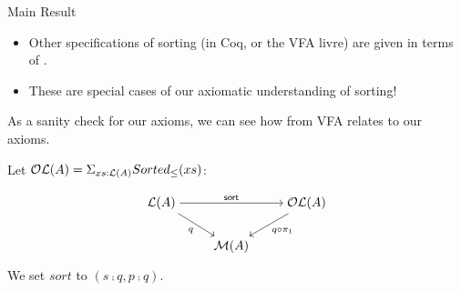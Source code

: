 \documentclass[9pt]{beamer}
\begin{document}
\begin{frame}{Main Result}

  \begin{tblock}[Remarks]
  \begin{itemize}
      \item Other specifications of sorting (in Coq, or the VFA livre) are given in terms of .
      \item These are special cases of our axiomatic understanding of sorting!
  \end{itemize}
  \end{tblock}

  As a sanity check for our axioms, we can
  see how  from VFA relates to our axioms.

  Let $\mathcal{OL}(A) = \Sigma_{xs : \mathcal{L}(A)} Sorted_\leq(xs)$:

      \[\begin{tikzcd}[ampersand replacement=\&,cramped]
            {\LL(A)} \&\& {\OL(A)} \\
            \& {\MM(A)}
            \arrow["{\term{sort}}", from=1-1, to=1-3]
            \arrow["q"', from=1-1, to=2-2]
            \arrow["{q \comp \pi_1}", from=1-3, to=2-2]
        \end{tikzcd}\]

  We set $sort$ to $(s \comp q, p \comp q)$.

\end{frame}
\end{document}
